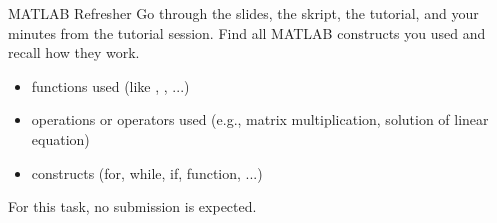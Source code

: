 \begin{task}{MATLAB Refresher}{}{}
  Go through the slides, the skript, the tutorial, and your minutes from the tutorial session.
  Find all MATLAB constructs you used and recall how they work.
  \begin{itemize}
  \item functions used (like , ,  ...)
  \item operations or operators used (e.g., matrix multiplication, solution of linear equation)
  \item constructs (for, while, if, function, ...)
  \end{itemize}
  For this task, no submission is expected.
  
\end{task}

